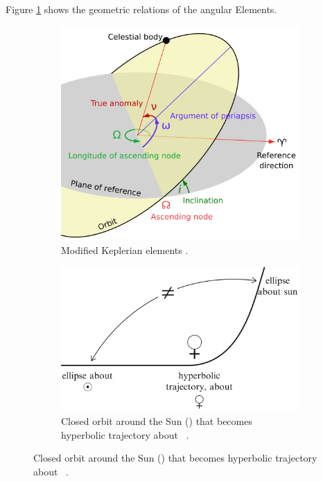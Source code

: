 Figure \ref{fig:kepler_elements} shows the geometric relations of the angular Elements.

\begin{figure}[htb]
    \centering
    \begin{subfigure}[b]{0.47\textwidth}
        \includegraphics[width=\textwidth]{doc/thesis/0_figures/Orbit_elements.png}
        \caption{Modified Keplerian elements \cite{Commons2019File:Orbit1.svgRepository}.}
        \label{fig:kepler_elements}
    \end{subfigure}
    \begin{subfigure}[b]{0.47\textwidth}
        \centering
        \includegraphics[width=\textwidth]{doc/thesis/0_figures/Hyperbolic_trajectory.png}
        \caption{Closed orbit around the Sun (\astrosun) that becomes hyperbolic trajectory about \venus~\cite{Hintz2015FundamentalsAstrodynamics}.}
        \label{fig:hyperbolic_orbit}
    \end{subfigure}
\end{figure}
    

